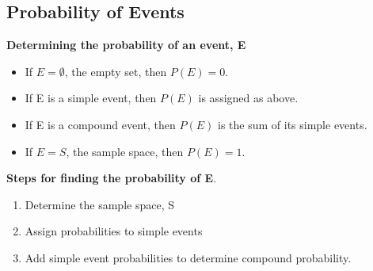 \documentclass[14pt]{extarticle}
\begin{document}
\subsection{Probability of Events}
\begin{tcolorbox}[enhanced jigsaw,colback=bg,boxrule=0pt,arc=0pt] 
	\textbf{Determining the probability of an event, E}
	\begin{itemize}
		\item If $E=\emptyset$, the empty set, then $P(E)=0$.
		\item If E is a simple event, then $P(E)$ is assigned as above.
		\item If E is a compound event, then $P(E)$ is the sum of its simple events.
		\item If $E=S$, the sample space, then $P(E)=1$.
	\end{itemize}
\end{tcolorbox}

\begin{tcolorbox}[enhanced jigsaw,colback=bg,boxrule=0pt,arc=0pt] 
	\textbf{Steps for finding the probability of E}.
	\begin{enumerate}
		\item Determine the sample space, S
		\item Assign probabilities to simple events
		\item Add simple event probabilities to determine compound probability.
	\end{enumerate}
\end{tcolorbox}
\end{document}
